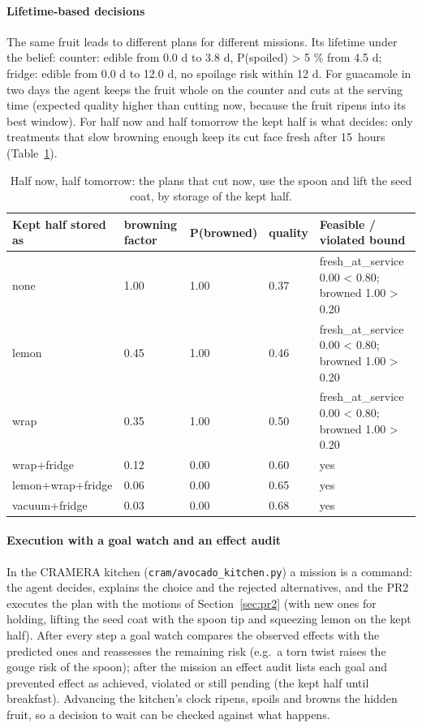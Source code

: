 \documentclass[10.5pt,a4paper]{article}
\begin{document}
\paragraph{Lifetime-based decisions} The same fruit leads to different plans for different missions. Its
lifetime under the belief: counter: edible from 0.0 d to 3.8 d, P(spoiled) > 5 \% from 4.5 d; fridge: edible from 0.0 d to 12.0 d, no spoilage risk within 12 d. For guacamole in two days the agent keeps
the fruit whole on the counter and cuts at the serving time (expected quality higher than cutting now, because the
fruit ripens into its best window). For half now and half tomorrow the kept half is what decides: only treatments
that slow browning enough keep its cut face fresh after 15~hours (Table~\ref{tab:keep}).
\begin{table}[htbp]\centering\scriptsize\caption{Half now, half tomorrow: the plans that cut now, use the spoon and lift the seed coat, by storage of the kept half.\label{tab:keep}}
\begin{tabularx}{\linewidth}{@{}llllX@{}}\toprule Kept half stored as & browning factor & P(browned) & quality & Feasible / violated bound \\\midrule
none & 1.00 & 1.00 & 0.37 & fresh\_at\_service 0.00 < 0.80; browned 1.00 > 0.20 \\
lemon & 0.45 & 1.00 & 0.46 & fresh\_at\_service 0.00 < 0.80; browned 1.00 > 0.20 \\
wrap & 0.35 & 1.00 & 0.50 & fresh\_at\_service 0.00 < 0.80; browned 1.00 > 0.20 \\
wrap+fridge & 0.12 & 0.00 & 0.60 & yes \\
lemon+wrap+fridge & 0.06 & 0.00 & 0.65 & yes \\
vacuum+fridge & 0.03 & 0.00 & 0.68 & yes \\\bottomrule\end{tabularx}\end{table}
\paragraph{Execution with a goal watch and an effect audit} In the CRAMERA kitchen
(\texttt{cram/avocado\_kitchen.py}) a mission is a command: the agent decides, explains the choice and the rejected
alternatives, and the PR2 executes the plan with the motions of Section~\ref{sec:pr2} (with new ones for holding,
lifting the seed coat with the spoon tip and squeezing lemon on the kept half). After every step a goal watch compares
the observed effects with the predicted ones and reassesses the remaining risk (e.g.\ a torn twist raises the
gouge risk of the spoon); after the mission an effect audit lists each goal and prevented effect as achieved,
violated or still pending (the kept half until breakfast). Advancing the kitchen's clock ripens, spoils and browns
the hidden fruit, so a decision to wait can be checked against what happens.
\end{document}
